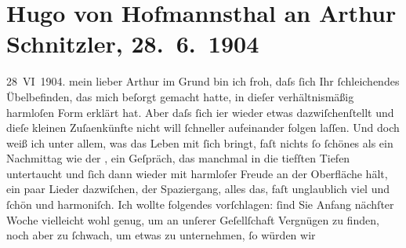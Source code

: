 

               \section[Hugo von Hofmannsthal an Arthur Schnitzler, 28. 6. 1904]{ Hugo von Hofmannsthal an Arthur Schnitzler, 28. 6. 1904}\nopagebreak{}\rehead{ }\begin{ledgroupsized}[t]{13cm}\normalsize\beginnumbering{} \toendnotes[C]{\smallbreak\pagebreak[2]} 
\toendnotes[C]{\smallbreak}\pstart
           \raggedleft{}{\pb}28 VI 1904.\pend
           \pstart{}mein lieber Arthur\pend\pstart
           im Grund bin ich froh, daſs ſich Ihr ſchleichendes Übelbefinden, das mich beſorgt
               gemacht hatte, in dieſer verhältnismäßig harmloſen Form erklärt hat.\pend
           \pstart
           Aber daſs ſich i{\geminationm}er wieder etwas dazwiſchenſtellt und
               dieſe kleinen Zuſa{\geminationm}enkünfte nicht will ſchneller
               aufeinander folgen laſſen. Und doch {\pb}weiß ich unter allem, was das
               Leben mit ſich bringt, faſt nichts ſo ſchönes als ein Nachmittag wie der \label{K_L01411_1v}\label{K_L01411_1h}, ein Geſpräch, das manchmal in die tiefſten Tiefen untertaucht und ſich dann
               wieder mit harmloſer Freude an der Oberfläche hält, ein paar Lieder dazwiſchen, {\pb}der Spaziergang, alles das, faſt
               unglaublich viel und ſchön und harmoniſch.\pend
           \pstart
           Ich wollte folgendes vorſchlagen: ſind Sie Anfang nächſter Woche vielleicht wohl
               genug, um an unſerer Geſellſchaft Vergnügen zu finden, noch aber zu ſchwach, um etwas
               zu unternehmen, ſo würden {\pb}wir

\end{ledgroupsized}
